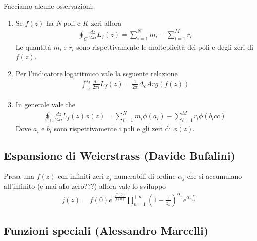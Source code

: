Facciamo alcune osservazioni:
\begin{enumerate}
	\item Se $f(z)$ ha $N$ poli e $K$ zeri allora
	\begin{align}
		\oint_C \frac{dz}{2\pi i} L_f(z) = \sum_{i=1}^{N} m_i - \sum_{l=1}^{M}r_l
	\end{align}
	Le quantità $m_i$ e $r_l$ sono rispettivamente le molteplicità dei poli e degli zeri di $f(z)$.
	\item Per l'indicatore logaritmico vale la seguente relazione
	\begin{align}
		\int_{z_i}^{z_f}\frac{dz}{2\pi i} L_f(z) = \frac{1}{2\pi} \Delta_c Arg(f(z))
	\end{align}
	\item In generale vale che
	\begin{align}
		\oint_C \frac{dz}{2\pi i} L_f(z) \phi(z) = \sum_{i=1}^{N} m_i\phi(a_i) - \sum_{l=1}^{M}r_l\phi(b_lcc)
	\end{align}
	Dove $a_i$ e $b_l$ sono rispettivamente i poli e gli zeri di $\phi(z)$. 
\end{enumerate}

\newpage

\subsection{Espansione di Weierstrass (Davide Bufalini)}
Presa una $f(z)$ con infiniti zeri $z_j$ numerabili di ordine $\alpha_j$ che si accumulano all'infinito (e mai allo zero???) allora vale lo sviluppo
\begin{align}
	f(z) =f(0) e^{z\frac{f'(0)}{f(0)}} \prod_{n=1}^{+\infty}\left( 1 - \frac{z}{z_n} \right)^{\alpha_n} e^{\alpha_n \frac{z}{z_n}}
\end{align}

\subsection{Funzioni speciali (Alessandro Marcelli)}

